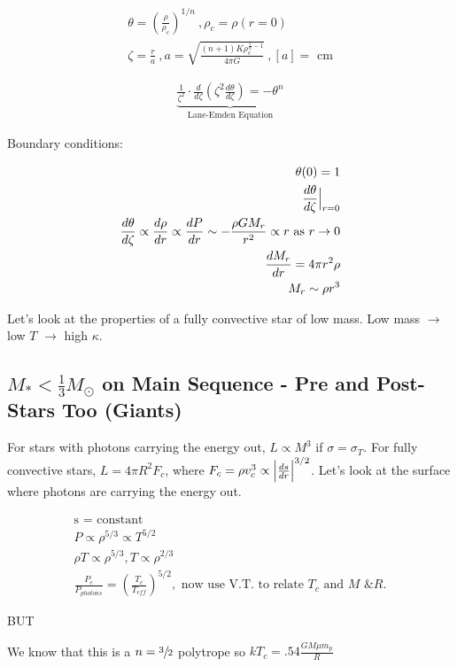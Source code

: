 \documentclass[10pt,letterpaper,final]{book}
\newcommand{\pt}{\propto}
\newcommand{\rp}{\right)}
\newcommand{\lp}{\left(}
\begin{document}
\begin{align}
\theta = \lp \frac{\rho}{\rho_c} \rp ^{1/n}~,\rho_c = \rho(r=0)\\
\zeta = \frac{r}{a}~, a = \sqrt{\frac{(n+1) K \rho_c ^{\frac{1}{n} -1}}{4 \pi G}}~,[a] = \text{ cm}
\end{align}

\begin{align}
\underbrace{\boxed{\frac{1}{\zeta^2} \cdot \frac{d}{d\zeta} \lp  \zeta^2 \frac{d\theta}{d\zeta} \rp = -\theta^n}}_{\text{Lane-Emden Equation}}
\end{align}

Boundary conditions:

\begin{align}
\theta (0) = 1\\
\frac{d \theta}{d \zeta} \Bigl\lvert_{r=0}\\
\frac{d \theta}{d \zeta} \pt \frac{d \rho}{dr} \pt \frac{dP}{dr} \sim -\frac{\rho GM_r}{r^2} \pt r \text{ as } r \rightarrow 0\\
\frac{dM_r}{dr} = 4 \pi r^2 \rho\\
M_r \sim \rho r^3
\end{align}

Let's look at the properties of a fully convective star of low mass. Low mass $\rightarrow$ low $T$ $\rightarrow$ high $\kappa$. 

\subsection{$M_* < \frac{1}{3} M_\odot$ on Main Sequence - Pre and Post-Stars Too (Giants)}

For stars with photons carrying the energy out, $L \pt M^3$ if $\sigma = \sigma_T$. For fully convective stars, $L = 4 \pi R^2 F_c$, where $F_c = \rho v_c^3 \pt \Bigl\lvert \frac{ds}{dr} \Bigl\lvert^{3/2}$. Let's look at the surface where photons are carrying the energy out. 

\begin{align}
\text{s = constant}\\
P \pt \rho^{5/3} \pt T^{5/2}\\
\rho T \pt \rho^{5/3}, T \pt \rho^{2/3}\\
\frac{P_c}{P_{photons}} = \lp \frac{T_c}{T_{eff}} \rp ^{5/2},\text{ now use V.T. to relate $T_c$ and $M$ \& $R$.}
\end{align}
\begin{center}
{\Huge BUT}
\end{center}
We know that this is a $n=\sfrac{3}{2}$ polytrope so $kT_c = .54 \frac{GM\mu m_p}{R}$
\end{document}
